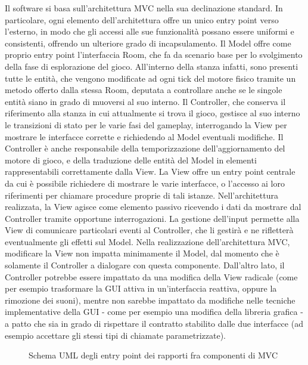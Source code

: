 \documentclass[a4paper,12pt]{report}
\begin{document}
Il software si basa sull’architettura MVC nella sua declinazione standard. In particolare, ogni elemento dell’architettura offre un unico entry point verso l’esterno, in modo che gli accessi alle sue funzionalità possano essere uniformi e consistenti, offrendo un ulteriore grado di incapsulamento.
%
\newline Il Model offre come proprio entry point l’interfaccia Room, che fa da scenario base per lo svolgimento della fase di esplorazione del gioco. All’interno della stanza infatti, sono presenti tutte le entità, che vengono modificate ad ogni tick del motore fisico tramite un metodo offerto dalla stessa Room, deputata a controllare anche se le singole entità siano in grado di muoversi al suo interno. 
%
\newline Il Controller, che conserva il riferimento alla stanza in cui attualmente si trova il gioco, gestisce al suo interno le transizioni di stato per le varie fasi del gameplay, interrogando la View per mostrare le interfacce corrette e richiedendo al Model eventuali modifiche. Il Controller è anche responsabile della temporizzazione dell’aggiornamento del motore di gioco, e della traduzione delle entità del Model in elementi rappresentabili correttamente dalla View.
%
\newline La View offre un entry point centrale da cui è possibile richiedere di mostrare le varie interfacce, o l’accesso ai loro riferimenti per chiamare procedure proprie di tali istanze. Nell’architettura realizzata, la View agisce come elemento passivo ricevendo i dati da mostrare dal Controller tramite opportune interrogazioni. La gestione dell’input permette alla View di comunicare particolari eventi al Controller, che li gestirà e ne rifletterà eventualmente gli effetti sul Model.
%
\newline Nella realizzazione dell’architettura MVC, modificare la View non impatta minimamente il Model, dal momento che è solamente il Controller a dialogare con questa componente. Dall’altro lato, il Controller potrebbe essere impattato da una modifica della View radicale (come per esempio trasformare la GUI attiva in un’interfaccia reattiva, oppure la rimozione dei suoni), mentre non sarebbe impattato da modifiche nelle tecniche implementative della GUI - come per esempio una modifica della libreria grafica - a patto che sia in grado di rispettare il contratto stabilito dalle due interfacce (ad esempio accettare gli stessi tipi di chiamate parametrizzate).


\begin{figure}[H]
	\centering{}
	
	\caption{Schema UML degli entry point dei rapporti fra componenti di MVC}
	\label{img:mvc}
\end{figure}
\end{document}
